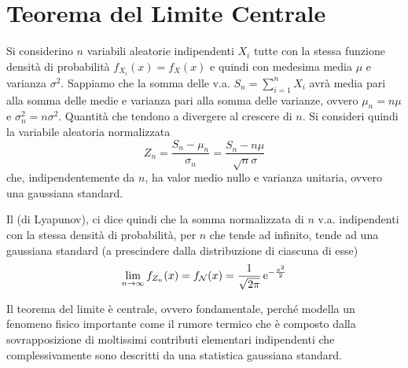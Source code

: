 \section{Teorema del Limite Centrale}
Si considerino $n$ variabili aleatorie indipendenti $X_i$ tutte con la stessa funzione densità di probabilità $f_{X_i}(x)=f_X(x)$ e quindi con medesima media $\mu$ e varianza $\sigma^2$. Sappiamo che la somma delle v.a. $S_n=\sum_{i=1}^{n}X_i$ avrà media pari alla somma delle medie e varianza pari alla somma delle varianze, ovvero $\mu_n=n\mu$ e $\sigma^2_n=n\sigma^2$. Quantità che tendono a divergere al crescere di $n$.
Si consideri quindi la variabile aleatoria normalizzata
\[Z_n=\frac{S_n-\mu_n}{\sigma_n}=\frac{S_n-n\mu}{\sqrt{n}\sigma}\]
che, indipendentemente da $n$, ha valor medio nullo e varianza unitaria, ovvero una gaussiana standard.

Il  (di Lyapunov), ci dice quindi che la somma normalizzata di $n$ v.a. indipendenti con la stessa densità di probabilità, per $n$ che tende ad infinito, tende ad una gaussiana standard (a prescindere dalla distribuzione di ciascuna di esse)
\begin{equation}
\lim\limits_{n\to\infty}f_{Z_n}(x)=f_\mathcal{N}(x)=\frac{1}{\sqrt{2\pi}}\operatorname{e}^{-\frac{x^2}{2}}
\end{equation}
\begin{nota}Il teorema del limite è centrale, ovvero fondamentale, perché modella un fenomeno fisico importante come il rumore termico che è composto dalla sovrapposizione di moltissimi contributi elementari indipendenti che complessivamente sono descritti da una statistica gaussiana standard.\end{nota}
